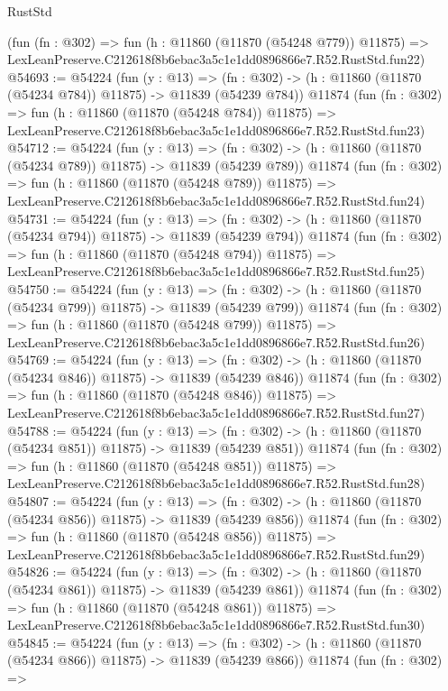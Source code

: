 \begin{lexlean}{RustStd}
\begin{coremodule}
    (fun (fn : @302) =>
    fun (h : @11860 (@11870 (@54248 @779)) @11875) =>
    LexLeanPreserve.C212618f8b6ebac3a5c1e1dd0896866e7.R52.RustStd.fun22)
@54693 := @54224
    (fun (y : @13) =>
    (fn : @302) -> (h : @11860 (@11870 (@54234 @784)) @11875) -> @11839 (@54239 @784))
    @11874
    (fun (fn : @302) =>
    fun (h : @11860 (@11870 (@54248 @784)) @11875) =>
    LexLeanPreserve.C212618f8b6ebac3a5c1e1dd0896866e7.R52.RustStd.fun23)
@54712 := @54224
    (fun (y : @13) =>
    (fn : @302) -> (h : @11860 (@11870 (@54234 @789)) @11875) -> @11839 (@54239 @789))
    @11874
    (fun (fn : @302) =>
    fun (h : @11860 (@11870 (@54248 @789)) @11875) =>
    LexLeanPreserve.C212618f8b6ebac3a5c1e1dd0896866e7.R52.RustStd.fun24)
@54731 := @54224
    (fun (y : @13) =>
    (fn : @302) -> (h : @11860 (@11870 (@54234 @794)) @11875) -> @11839 (@54239 @794))
    @11874
    (fun (fn : @302) =>
    fun (h : @11860 (@11870 (@54248 @794)) @11875) =>
    LexLeanPreserve.C212618f8b6ebac3a5c1e1dd0896866e7.R52.RustStd.fun25)
@54750 := @54224
    (fun (y : @13) =>
    (fn : @302) -> (h : @11860 (@11870 (@54234 @799)) @11875) -> @11839 (@54239 @799))
    @11874
    (fun (fn : @302) =>
    fun (h : @11860 (@11870 (@54248 @799)) @11875) =>
    LexLeanPreserve.C212618f8b6ebac3a5c1e1dd0896866e7.R52.RustStd.fun26)
@54769 := @54224
    (fun (y : @13) =>
    (fn : @302) -> (h : @11860 (@11870 (@54234 @846)) @11875) -> @11839 (@54239 @846))
    @11874
    (fun (fn : @302) =>
    fun (h : @11860 (@11870 (@54248 @846)) @11875) =>
    LexLeanPreserve.C212618f8b6ebac3a5c1e1dd0896866e7.R52.RustStd.fun27)
@54788 := @54224
    (fun (y : @13) =>
    (fn : @302) -> (h : @11860 (@11870 (@54234 @851)) @11875) -> @11839 (@54239 @851))
    @11874
    (fun (fn : @302) =>
    fun (h : @11860 (@11870 (@54248 @851)) @11875) =>
    LexLeanPreserve.C212618f8b6ebac3a5c1e1dd0896866e7.R52.RustStd.fun28)
@54807 := @54224
    (fun (y : @13) =>
    (fn : @302) -> (h : @11860 (@11870 (@54234 @856)) @11875) -> @11839 (@54239 @856))
    @11874
    (fun (fn : @302) =>
    fun (h : @11860 (@11870 (@54248 @856)) @11875) =>
    LexLeanPreserve.C212618f8b6ebac3a5c1e1dd0896866e7.R52.RustStd.fun29)
@54826 := @54224
    (fun (y : @13) =>
    (fn : @302) -> (h : @11860 (@11870 (@54234 @861)) @11875) -> @11839 (@54239 @861))
    @11874
    (fun (fn : @302) =>
    fun (h : @11860 (@11870 (@54248 @861)) @11875) =>
    LexLeanPreserve.C212618f8b6ebac3a5c1e1dd0896866e7.R52.RustStd.fun30)
@54845 := @54224
    (fun (y : @13) =>
    (fn : @302) -> (h : @11860 (@11870 (@54234 @866)) @11875) -> @11839 (@54239 @866))
    @11874
    (fun (fn : @302) =>

\end{coremodule}
\end{lexlean}

